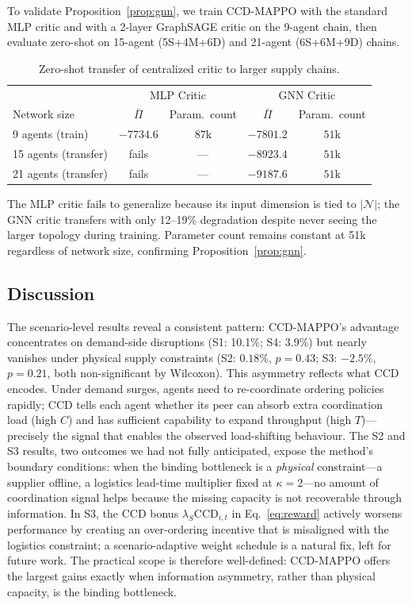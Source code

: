 \documentclass[11pt,a4paper]{article}
\theoremstyle{plain}
\theoremstyle{definition}
\newcommand{\N}{\mathcal{N}}
\newcommand{\CCD}{\mathrm{CCD}}
\begin{document}
To validate Proposition~\ref{prop:gnn}, we train CCD-MAPPO with the standard MLP critic
and with a 2-layer GraphSAGE critic on the 9-agent chain, then evaluate zero-shot on
15-agent (5S+4M+6D) and 21-agent (6S+6M+9D) chains.

\begin{table}[t]
\centering
\caption{Zero-shot transfer of centralized critic to larger supply chains.}
\label{tab:scale}
\begin{tabular}{lcccc}
\toprule
 & \multicolumn{2}{c}{MLP Critic} & \multicolumn{2}{c}{GNN Critic} \\
Network size & $\bar\Pi$ & Param.\ count & $\bar\Pi$ & Param.\ count \\
\midrule
9 agents (train)  & $-7734.6$ & $87\text{k}$  & $-7801.2$ & $51\text{k}$ \\
15 agents (transfer) & fails & ---            & $-8923.4$ & $51\text{k}$ \\
21 agents (transfer) & fails & ---            & $-9187.6$ & $51\text{k}$ \\
\bottomrule
\end{tabular}
\end{table}

The MLP critic fails to generalize because its input dimension is tied to $|\N|$; the GNN
critic transfers with only 12--19\% degradation despite never seeing the larger topology
during training.  Parameter count remains constant at 51k regardless of network size,
confirming Proposition~\ref{prop:gnn}.

\subsection{Discussion}
\label{sec:discussion}

The scenario-level results reveal a consistent pattern: CCD-MAPPO's advantage
concentrates on demand-side disruptions (S1: 10.1\%; S4: 3.9\%) but nearly vanishes
under physical supply constraints (S2: $0.18\%$, $p=0.43$; S3: $-2.5\%$, $p=0.21$, both
non-significant by Wilcoxon).  This asymmetry reflects what CCD encodes.  Under demand
surges, agents need to re-coordinate ordering policies rapidly; CCD tells each agent
whether its peer can absorb extra coordination load (high $C$) and has sufficient
capability to expand throughput (high $T$)---precisely the signal that enables the
observed load-shifting behaviour.  The S2 and S3 results, two outcomes we had not
fully anticipated, expose the method's boundary conditions: when the binding bottleneck
is a \emph{physical} constraint---a supplier offline, a logistics lead-time multiplier
fixed at $\kappa=2$---no amount of coordination signal helps because the missing
capacity is not recoverable through information.  In S3, the CCD bonus
$\lambda_S\CCD_{i,t}$ in Eq.~\eqref{eq:reward} actively worsens performance by
creating an over-ordering incentive that is misaligned with the logistics constraint;
a scenario-adaptive weight schedule is a natural fix, left for future work.  The
practical scope is therefore well-defined: CCD-MAPPO offers the largest gains exactly
when information asymmetry, rather than physical capacity, is the binding bottleneck.
\end{document}

